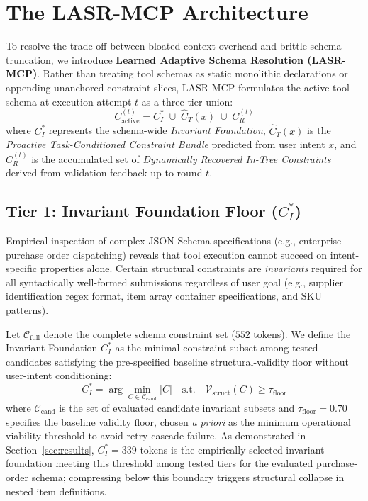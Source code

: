 \section{The LASR-MCP Architecture}
\label{sec:architecture}

To resolve the trade-off between bloated context overhead and brittle schema truncation, we introduce \textbf{Learned Adaptive Schema Resolution (LASR-MCP)}. Rather than treating tool schemas as static monolithic declarations or appending unanchored constraint slices, LASR-MCP formulates the active tool schema at execution attempt $t$ as a three-tier union:
\begin{equation}
\label{eq:three_tier}
C_{\text{active}}^{(t)} = C_I^* \;\cup\; \hat{C}_T(x) \;\cup\; C_R^{(t)}
\end{equation}
where $C_I^*$ represents the schema-wide \textit{Invariant Foundation}, $\hat{C}_T(x)$ is the \textit{Proactive Task-Conditioned Constraint Bundle} predicted from user intent $x$, and $C_R^{(t)}$ is the accumulated set of \textit{Dynamically Recovered In-Tree Constraints} derived from validation feedback up to round $t$.

\subsection{Tier 1: Invariant Foundation Floor ($C_I^*$)}
Empirical inspection of complex JSON Schema specifications (e.g., enterprise purchase order dispatching) reveals that tool execution cannot succeed on intent-specific properties alone. Certain structural constraints are \textit{invariants} required for all syntactically well-formed submissions regardless of user goal (e.g., supplier identification regex format, item array container specifications, and SKU patterns).

Let $\mathcal{C}_{\text{full}}$ denote the complete schema constraint set ($552$ tokens). We define the Invariant Foundation $C_I^*$ as the minimal constraint subset among tested candidates satisfying the pre-specified baseline structural-validity floor without user-intent conditioning:
\begin{equation}
C_I^* = \arg\min_{C \in \mathcal{C}_{\text{cand}}} |C| \quad \text{s.t.} \quad \mathcal{V}_{\text{struct}}(C) \ge \tau_{\text{floor}}
\end{equation}
where $\mathcal{C}_{\text{cand}}$ is the set of evaluated candidate invariant subsets and $\tau_{\text{floor}} = 0.70$ specifies the baseline validity floor, chosen \textit{a priori} as the minimum operational viability threshold to avoid retry cascade failure. As demonstrated in Section~\ref{sec:results}, $C_I^* = 339$ tokens is the empirically selected invariant foundation meeting this threshold among tested tiers for the evaluated purchase-order schema; compressing below this boundary triggers structural collapse in nested item definitions.

